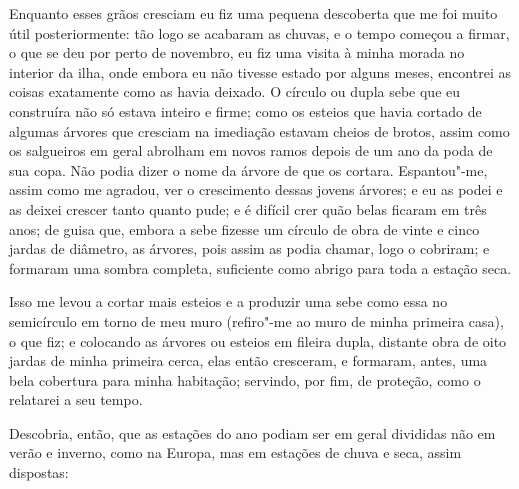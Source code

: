 Enquanto esses grãos cresciam eu fiz uma pequena descoberta que me foi
muito útil posteriormente: tão logo se acabaram as chuvas, e o tempo
começou a firmar, o que se deu por perto de novembro, eu fiz uma visita
à minha morada no interior da ilha, onde embora eu não tivesse estado
por alguns meses, encontrei as coisas exatamente como as havia deixado.
O círculo ou dupla sebe que eu construíra não só estava inteiro e firme;
como os esteios que havia cortado de algumas árvores que cresciam na
imediação estavam cheios de brotos, assim como os salgueiros em geral
abrolham em novos ramos depois de um ano da poda de sua copa. Não podia
dizer o nome da árvore de que os cortara. Espantou"-me, assim como me
agradou, ver o crescimento dessas jovens árvores; e eu as podei e as
deixei crescer tanto quanto pude; e é difícil crer quão belas ficaram em
três anos; de guisa que, embora a sebe fizesse um círculo de obra de
vinte e cinco jardas de diâmetro, as árvores, pois assim as podia
chamar, logo o cobriram; e formaram uma sombra completa, suficiente como
abrigo para toda a estação seca.

Isso me levou a cortar mais esteios e a produzir uma sebe como essa no
semicírculo em torno de meu muro (refiro"-me ao muro de minha primeira
casa), o que fiz; e colocando as árvores ou esteios em fileira dupla,
distante obra de oito jardas de minha primeira cerca, elas então
cresceram, e formaram, antes, uma bela cobertura para minha habitação;
servindo, por fim, de proteção, como o relatarei a seu tempo.

Descobria, então, que as estações do ano podiam ser em geral divididas
não em verão e inverno, como na Europa, mas em estações de chuva e seca,
assim dispostas:

\medskip

